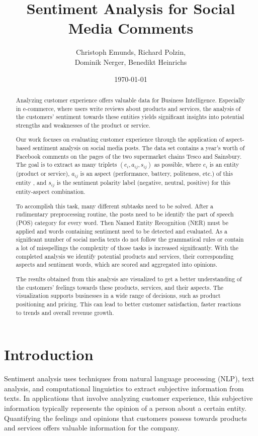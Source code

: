 \documentclass[10pt,a4paper]{article}
\title{\Huge{Sentiment Analysis for Social Media Comments}}
\author{Christoph Emunds, Richard Polzin,\\Dominik Nerger, Benedikt Heinrichs}
\date{\today}
\begin{document}
	
	\maketitle
	\begin{abstract}
	Analyzing customer experience offers valuable data for Business Intelligence. Especially in e-commerce, where users write reviews about pro\-ducts and services, the analysis of the customers' sentiment towards these entities yields significant insights into potential strengths and weaknesses of the product or service.

	Our work focuses on evaluating customer experience through the application of aspect-based sentiment analysis on social media posts. The data set contains a year's worth of Facebook comments on the pages of the two supermarket chains Tesco and Sainsbury. The goal is to extract as many triplets $(e_{i}, a_{ij}, s_{ij})$ as possible, where $e_{i}$ is an entity (product or service), $a_{ij}$ is an aspect (performance, battery, politeness, etc.) of this entity , and $s_{ij}$ is the sentiment polarity label (negative, neutral, positive) for this entity-aspect combination.

	To accomplish this task, many different subtasks need to be solved. After a rudimentary preprocessing routine, the posts need to be identify the part of speech (POS) category for every word. Then Named Entity Recognition (NER) must be applied and words containing sentiment need to be detected and evaluated. As a significant number of social media texts do not follow the grammatical rules or contain a lot of misspellings the complexity of those tasks is increased significantly. With the completed analysis we identify potential products and services, their corresponding aspects and sentiment words, which are scored and aggregated into opinions.

	The results obtained from this analysis are visualized to get a better understanding of the customers' feelings towards these products, services, and their aspects. The visualization supports businesses in a wide range of decisions, such as product positioning and pricing. This can lead to better customer satisfaction, faster reactions to trends and overall revenue growth.
	\end{abstract}
	
	\newpage
	\tableofcontents
	\newpage
	
	\section{Introduction}	
	Sentiment analysis uses techniques from natural language processing (NLP), text analysis, and computational linguistics to extract subjective information from texts. In applications that involve analyzing customer experience, this subjective information typically represents the opinion of a person about a certain entity. Quantifying the feelings and opinions that customers possess towards products and services offers valuable information for the company. 
	
\end{document}
